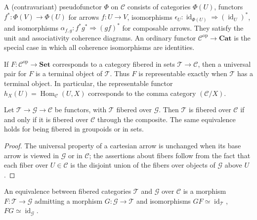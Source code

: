 \begin{definition}[pseudofunctor]\label{fga-def-3-10}\uses{}
A (contravariant) pseudofunctor $\Phi$ on $\mathcal C$ consists of categories
$\Phi(U)$, functors $f^*:\Phi(V)\to\Phi(U)$ for arrows $f:U\to V$,
isomorphisms $\epsilon_U:\operatorname{id}_{\Phi(U)}\Rightarrow(\operatorname{id}_U)^*$,
and isomorphisms $\alpha_{f,g}:f^*g^*\Rightarrow(gf)^*$ for composable arrows.
They satisfy the unit and associativity coherence diagrams.  An ordinary functor
$\mathcal C^{\mathrm{op}}\to\mathbf{Cat}$ is the special case in which all
coherence isomorphisms are identities.
\end{definition}

\begin{remark}\label{fga-rem-3-27}\uses{}
If $F:\mathcal C^{\mathrm{op}}\to\mathbf{Set}$ corresponds to a category
fibered in sets $\mathcal T\to\mathcal C$, then a universal pair for $F$ is a
terminal object of $\mathcal T$.  Thus $F$ is representable exactly when
$\mathcal T$ has a terminal object.  In particular, the representable functor
$h_X(U)=\operatorname{Hom}_{\mathcal C}(U,X)$ corresponds to the comma category
$(\mathcal C/X)$.
\end{remark}

\begin{proposition}\label{fga-pro-3-28}\uses{}
Let $\mathcal T\to\mathcal G\to\mathcal C$ be functors, with $\mathcal T$
fibered over $\mathcal G$.  Then $\mathcal T$ is fibered over $\mathcal C$ if
and only if it is fibered over $\mathcal C$ through the composite.  The same
equivalence holds for being fibered in groupoids or in sets.
\end{proposition}
\begin{proof}
The universal property of a cartesian arrow is unchanged when its base arrow is
viewed in $\mathcal G$ or in $\mathcal C$; the assertions about fibers follow
from the fact that each fiber over $U\in\mathcal C$ is the disjoint union of
the fibers over objects of $\mathcal G$ above $U$.
\end{proof}

\begin{definition}\label{fga-def-3-34}\uses{}
An equivalence between fibered categories $\mathcal T$ and $\mathcal G$ over
$\mathcal C$ is a morphism $F:\mathcal T\to\mathcal G$ admitting a morphism
$G:\mathcal G\to\mathcal T$ and isomorphisms $GF\simeq\operatorname{id}_{\mathcal T}$,
$FG\simeq\operatorname{id}_{\mathcal G}$.
\end{definition}

